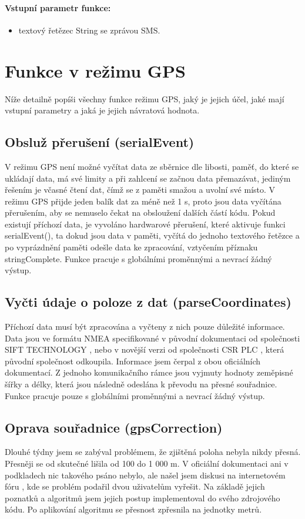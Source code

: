 \documentclass[FM,MP]{tulthesis}  %
\begin{document}
\paragraph{Vstupní parametr funkce:}
\begin{itemize}
\item textový řetězec String se zprávou SMS.
\end{itemize}


\section{Funkce v režimu GPS}
Níže detailně popíši všechny funkce režimu GPS, jaký je jejich účel, jaké mají vstupní parametry a jaká je jejich návratová hodnota.

\subsection{Obsluž přerušení (serialEvent)}
V režimu GPS není možné vyčítat data ze sběrnice dle libosti, paměť, do které se ukládají data, má své limity a při zahlcení se začnou data přemazávat, jediným řešením je včasné čtení dat, čímž se z paměti smažou a uvolní své místo. V režimu GPS přijde jeden balík dat za méně než 1 s, proto jsou data vyčítána přerušením, aby se nemuselo čekat na obsloužení dalších částí kódu. Pokud existují příchozí data, je vyvoláno hardwarové přerušení, které aktivuje funkci serialEvent(), ta dokud jsou data v paměti, vyčítá do jednoho textového řetězce a po vyprázdnění paměti odešle data ke zpracování, vztyčením příznaku stringComplete. Funkce pracuje s globálními proměnnými a nevrací žádný výstup.

\subsection{Vyčti údaje o poloze z dat (parseCoordinates)}
Příchozí data musí být zpracována a vyčteny z nich pouze důležité informace. Data jsou ve formátu NMEA specifikované v původní dokumentaci od společnosti SIFT TECHNOLOGY \cite{SIFT}, nebo v novější verzi od společnosti CSR PLC \cite{CSR}, která původní společnost odkoupila. Informace jsem čerpal z obou oficiálních dokumentací. Z jednoho komunikačního rámce jsou vyjmuty hodnoty zeměpisné šířky a délky, která jsou následně odeslána k převodu na přesné souřadnice. Funkce pracuje pouze s globálními proměnnými a nevrací žádný výstup.

\subsection{Oprava souřadnice (gpsCorrection)}
Dlouhé týdny jsem se zabýval problémem, že zjištěná poloha nebyla nikdy přesná. Přesněji se od skutečné lišila od 100 do 1 000 m. V oficiální dokumentaci ani v podkladech nic takového psáno nebylo, ale našel jsem diskusi na internetovém fóru \cite{correct}, kde se problém podařil dvou uživatelům vyřešit. Na základě jejich poznatků a algoritmů jsem jejich postup implementoval do svého zdrojového kódu. Po aplikování algoritmu se přesnost zpřesnila na jednotky metrů.
\end{document}
